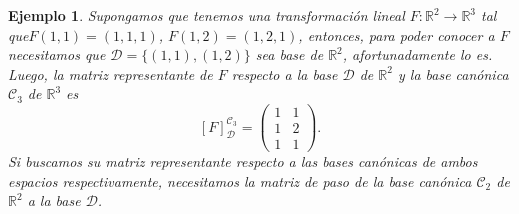 \documentclass[12pt]{book}
\newtheorem{ejem}{Ejemplo}
\def\R{\mathbb{R}}
\def\D{\mathcal{D}}
\def\Ccal{\mathcal{C}}
\begin{document}
\begin{ejem}
 {\em 
    Supongamos que tenemos una transformación lineal $F:\R^2\rightarrow\R^3$ tal que\break $F(1,1)=(1,1,1)$, $F(1,2)=(1,2,1)$, entonces, para poder conocer a $F$ necesitamos que $\D=\{(1,1),(1,2)\}$ sea base de $\R^2$, afortunadamente lo es.
    Luego, la matriz representante de $F$ respecto a la base $\D$ de $\R^2$ y la base canónica $\Ccal_3$ de $\R^3$ es 
    $$ [F]_{\D}^{\Ccal_3}=\left(\begin{array}{cc} 1& 1\\ 1 & 2\\1&1\end{array}\right).$$
    Si buscamos su matriz representante respecto a las bases canónicas de ambos espacios respectivamente, necesitamos la matriz de paso de la base canónica $\Ccal_2$ de $\R^2$ a la base $\D$.
    
}
\end{ejem}
\end{document}
